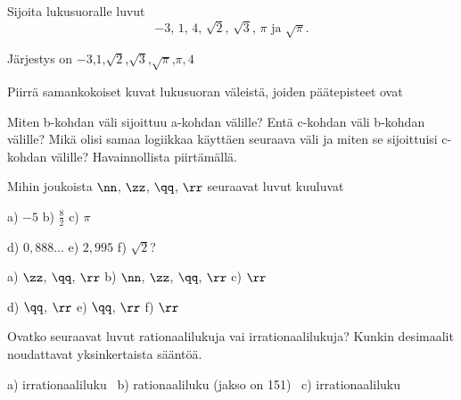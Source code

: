 \begin{tehtavasivu}

\begin{tehtava}%
Sijoita lukusuoralle luvut
\[
\mbox{$-3$, $1$, $4$, $\sqrt{2}$, $\sqrt{3}$, $\pi$ ja $\sqrt{\pi}$.}
\]
\begin{vastaus}
Järjestys on \mbox{$-3$,$1$,$\sqrt{2}$,$\sqrt{3}$,$\sqrt{\pi}$,$\pi,4$}
\end{vastaus}
\end{tehtava}

\begin{tehtava} %
Piirrä samankokoiset kuvat lukusuoran väleistä, joiden päätepisteet ovat 
\begin{alakohdat}
\end{alakohdat}
Miten b-kohdan väli sijoittuu a-kohdan välille? Entä c-kohdan väli b-kohdan välille? Mikä olisi samaa logiikkaa käyttäen seuraava väli ja miten se sijoittuisi c-kohdan välille? Havainnollista piirtämällä.
\begin{vastaus}
\begin{alakohdat}
\alakohta{}
\alakohta{}
\alakohta{}
\end{alakohdat}
\end{vastaus}
\end{tehtava}


\begin{tehtava}
Mihin joukoista $\nn$, $\zz$, $\qq$, $\rr$ seuraavat luvut kuuluvat

a) $-5$ \qquad b) $\frac82$ \qquad c) $\pi$

d) $0,888...$ \qquad e) $2,995$ \qquad f) $\sqrt{2}$?

\begin{vastaus}
a) $\zz$, $\qq$, $\rr$ \qquad b) $\nn$, $\zz$, $\qq$, $\rr$ \qquad c) $\rr$

d) $\qq$, $\rr$ \qquad e) $\qq$, $\rr$ \qquad f) $\rr$
\end{vastaus}
\end{tehtava}

\begin{tehtava}
Ovatko seuraavat luvut rationaalilukuja vai irrationaalilukuja? Kunkin desimaalit
noudattavat yksinkertaista sääntöä.
\begin{alakohdat}
\end{alakohdat}
\begin{vastaus}
a) irrationaaliluku \ b) rationaaliluku (jakso on 151) \ c) irrationaaliluku
\end{vastaus}
\end{tehtava}


\end{tehtavasivu}

